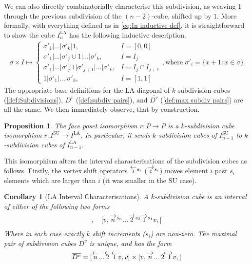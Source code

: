 \documentclass{amsart}
\newtheorem{corollary}[theorem]{Corollary}
\newtheorem{proposition}[theorem]{Proposition}
\theoremstyle{definition}
\newcommand{\SU}{\mathrm{SU}}
\newcommand{\LA}{\mathrm{LA}}
\newcommand{\rightshift}[1]{\overrightarrow{\vphantom{1}{#1}}}
\newcommand{\rightshiftk}[2]{\overrightarrow{\vphantom{1}{#1}}^{#2}}
\newcommand{\leftshift}[1]{\overleftarrow{\vphantom{1}{#1}}}
\newcommand{\leftshiftk}[2]{\overleftarrow{\vphantom{1}{#1}}^{#2}}
\newcommand{\subdivpairsv}{D^v}
\newcommand{\maxsubdivpairsv}{\overline{D^v}}
\begin{document}
We can also directly combinatorially characterise this subdivision, as  weaving $1$ through the previous subdivision of the $(n-2)$-cube, shifted up by $1$.
More formally, with everything defined as in \cref{eq:In inductive def}, it is straightforward to show the cube $I_{n}^{\LA}$ has the following inductive description.
\begin{align} \label{eq:In LA inductive def}
    \sigma \times I \mapsto 
    \begin{cases}
        \sigma'_1|...|\sigma'_k| 1, &I = [0, 0]\\
        \sigma'_1|...|\sigma'_j \cup 1|...|\sigma'_k, &I = I_j\\
        \sigma'_1|...|\sigma'_j|1|\sigma'_{j+1}|...|\sigma'_k, &I = I_j \cap I_{j+1}\\
        1|\sigma'_1|...|\sigma'_k, &I = [1, 1]
    \end{cases}
    , \text{where } \sigma'_i = \{x+1:x\in \sigma\}
\end{align}
The appropriate base definitions for the $\LA$ diagonal of $k$-subdivision cubes (\ref{def:Subdivisions}),  ${\subdivpairsv}$ (\ref{def:subdiv pairs}), and $\maxsubdivpairsv$ (\ref{def:max subdiv pairs}) are all the same.
We then immediately observe, that by construction.
\begin{proposition}
The face poset isomorphism $r: P\to P$ is a $k$-subdivision cube isomorphism $r:I^{\SU}\to I^{\LA}$. In particular, it sends $k$-subdivision cubes of $I^{\SU}_{n-1}$ to $k$-subdivision cubes of $I^{\LA}_{n-1}$.
\end{proposition}
This isomorphism alters the interval characterisations of the subdivision cubes as follows.
Firstly, the vertex shift operators $\leftshiftk{i}{s_i}$ ($\rightshiftk{i}{s_i}$) moves element $i$ past $s_i$ elements which are larger than $i$ (it was smaller in the $\SU$ case).
\begin{corollary}[LA Interval Characterisations]
A $k$-subdivision cube is an interval of either of the following two forms
\begin{align*}
     [\leftshiftk{n}{s_n}...\leftshiftk{2}{s_{2}}\leftshiftk{1}{s_1}v,v], \quad [v,\rightshiftk{n}{s_n}... \rightshiftk{2}{s_{2}}\rightshiftk{1}{s_1}v,]
\end{align*}
Where in each case exactly $k$ shift increments ($s_i$) are non-zero.
The maximal pair of subdivision cubes $\maxsubdivpairsv$ is unique, and has the form 
\begin{align*}
    \maxsubdivpairsv=[\leftshift{n}...\leftshift{2}\leftshift{1}v,v] \times [v,\rightshift{n}... \rightshift{2}\rightshift{1}v,]
\end{align*}

\end{corollary}
\end{document}
